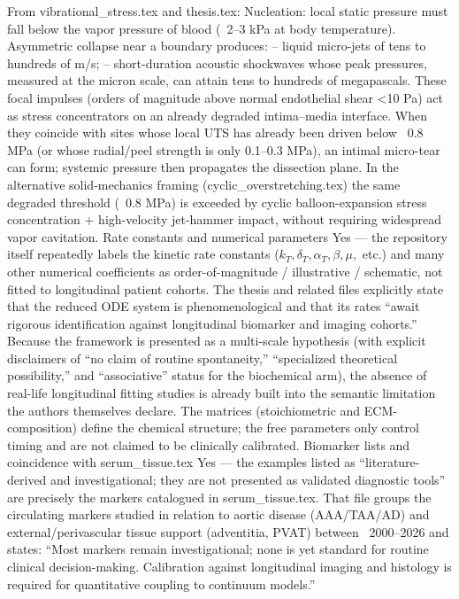 From vibrational_stress.tex and thesis.tex:
Nucleation: local static pressure must fall below the vapor pressure of blood (~2–3 kPa at body temperature).  
Asymmetric collapse near a boundary produces:
– liquid micro-jets of tens to hundreds of m/s;
– short-duration acoustic shockwaves whose peak pressures, measured at the micron scale, can attain tens to hundreds of megapascals.
These focal impulses (orders of magnitude above normal endothelial shear <10 Pa) act as stress concentrators on an already degraded intima–media interface. When they coincide with sites whose local UTS has already been driven below ~0.8 MPa (or whose radial/peel strength is only 0.1–0.3 MPa), an intimal micro-tear can form; systemic pressure then propagates the dissection plane.
In the alternative solid-mechanics framing (cyclic_overstretching.tex) the same degraded threshold (~0.8 MPa) is exceeded by cyclic balloon-expansion stress concentration + high-velocity jet-hammer impact, without requiring widespread vapor cavitation.
Rate constants and numerical parameters
Yes — the repository itself repeatedly labels the kinetic rate constants (\(k_T, \delta_T, \alpha_T, \beta, \mu,\) etc.) and many other numerical coefficients as order-of-magnitude / illustrative / schematic, not fitted to longitudinal patient cohorts. The thesis and related files explicitly state that the reduced ODE system is phenomenological and that its rates “await rigorous identification against longitudinal biomarker and imaging cohorts.”  
Because the framework is presented as a multi-scale hypothesis (with explicit disclaimers of “no claim of routine spontaneity,” “specialized theoretical possibility,” and “associative” status for the biochemical arm), the absence of real-life longitudinal fitting studies is already built into the semantic limitation the authors themselves declare. The matrices (stoichiometric and ECM-composition) define the chemical structure; the free parameters only control timing and are not claimed to be clinically calibrated.
Biomarker lists and coincidence with serum_tissue.tex
Yes — the examples listed as “literature-derived and investigational; they are not presented as validated diagnostic tools” are precisely the markers catalogued in serum_tissue.tex. That file groups the circulating markers studied in relation to aortic disease (AAA/TAA/AD) and external/perivascular tissue support (adventitia, PVAT) between ~2000–2026 and states:
“Most markers remain investigational; none is yet standard for routine clinical decision-making. Calibration against longitudinal imaging and histology is required for quantitative coupling to continuum models.”
